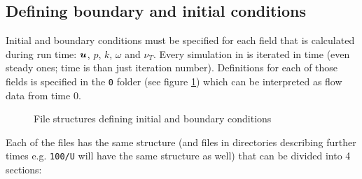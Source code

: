        \subsection{Defining boundary and initial conditions}
            Initial and boundary conditions must be specified for each field that is calculated during run time: $\bm{{u}}$, $p$, $k$, $\omega$ and $\nu_T$.
            Every simulation in \oFoam is iterated in time (even steady ones; time is than just iteration number).
            Definitions for each of those fields is specified in the \texttt{0} folder (see figure \ref{fig::ofoam_0}) which can be interpreted as flow data from time $0$.
            \begin{figure}[b!]
      
                \caption{File structures defining initial and boundary conditions}
                \label{fig::ofoam_0}
            \end{figure}
            Each of the files has the same structure (and files in directories describing further times e.g. \texttt{100/U} will have the same structure as well) that can be divided into 4 sections:
